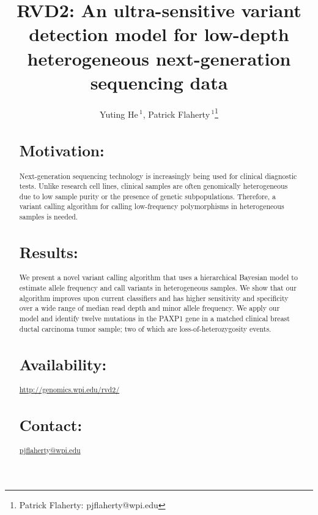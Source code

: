 \documentclass{bioinfo}
\begin{document}

\title[RVD2]{RVD2: An ultra-sensitive variant detection model for low-depth heterogeneous next-generation sequencing data}
\author[He \textit{et~al}]{Yuting He\,$^{1}$, Patrick Flaherty\,$^{1}$\footnote{Patrick Flaherty: pjflaherty@wpi.edu}}
\address{$^{1}$Department of Biomedical Engineering, Worcester Polytechnic Institute, Worcester, MA, USA}



\maketitle

\begin{abstract}

\section{Motivation:}Next-generation sequencing technology is increasingly being used for clinical diagnostic tests. Unlike research cell lines, clinical samples are often genomically heterogeneous due to low sample purity or the presence of genetic subpopulations. Therefore, a variant calling algorithm for calling low-frequency polymorphisms in heterogeneous samples is needed.

\section{Results:}We present a novel variant calling algorithm that uses a hierarchical Bayesian model to estimate allele frequency and call variants in heterogeneous samples. We show that our algorithm improves upon current classifiers and has higher sensitivity and specificity over a wide range of median read depth and minor allele frequency. We apply our model and identify twelve mutations in the PAXP1 gene in a matched clinical breast ductal carcinoma tumor sample; two of which are loss-of-heterozygosity events.


\section{Availability:}
\href{http://genomics.wpi.edu/rvd2/}{http://genomics.wpi.edu/rvd2/}

\section{Contact:} \href{pjflaherty@wpi.edu}{pjflaherty@wpi.edu}
\end{abstract}
\end{document}
